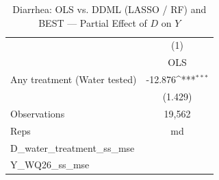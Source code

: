 \begin{table}[htbp]\centering
\def\sym#1{\ifmmode^{#1}\else\(^{#1}\)\fi}
\caption{Diarrhea: OLS vs. DDML (LASSO / RF) and BEST — Partial Effect of $D$ on $Y$}
\begin{tabular}{l*{1}{c}}
\toprule
                &\multicolumn{1}{c}{(1)}\\
                &\multicolumn{1}{c}{OLS}\\
\midrule
Any treatment (Water tested)&  -12.876\sym{***}\\
                &  (1.429)         \\
\midrule
Observations    &   19,562         \\
Reps            &       md         \\
D\_water\_treatment\_ss\_mse&                  \\
Y\_WQ26\_ss\_mse   &                  \\
\bottomrule
\end{tabular}
\end{table}
